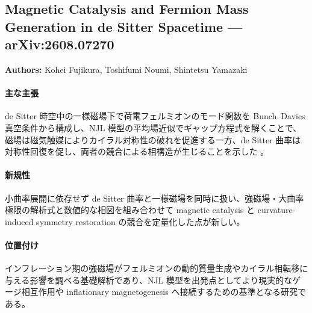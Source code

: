\subsection{Magnetic Catalysis and Fermion Mass Generation in de Sitter Spacetime --- arXiv:2608.07270}

\textbf{Authors:} Kohei Fujikura, Toshifumi Noumi, Shintetsu Yamazaki

\paragraph{主な主張}
de Sitter 時空中の一様磁場下で荷電フェルミオンのモード関数を Bunch--Davies 真空条件から構成し、NJL 模型の平均場近似でギャップ方程式を解くことで、磁場は磁気触媒によりカイラル対称性の破れを促進する一方、de Sitter 曲率は対称性回復を促し、両者の競合による相構造が生じることを示した \cite{Fujikura:2026magnetic}。

\paragraph{新規性}
小曲率展開に依存せず de Sitter 曲率と一様磁場を同時に扱い、強磁場・大曲率極限の解析式と数値的な相図を組み合わせて magnetic catalysis と curvature-induced symmetry restoration の競合を定量化した点が新しい。

\paragraph{位置付け}
インフレーション期の強磁場がフェルミオンの動的質量生成やカイラル相転移に与える影響を調べる基礎解析であり、NJL 模型を出発点としてより現実的なゲージ相互作用や inflationary magnetogenesis へ接続するための基準となる研究である。
